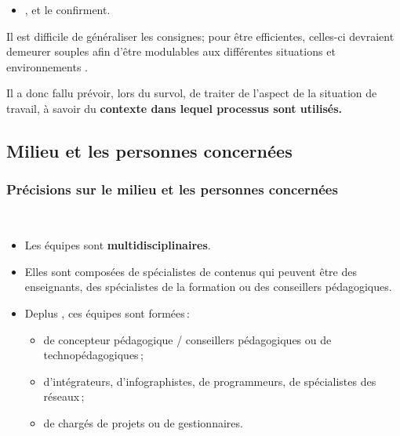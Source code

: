 \begin{frame}[allowframebreaks]
\begin{itemize}
                   \item \citet[p.10]{retalis1997a}, \citet[p.46]{smith2006a} et \citet[p.3]{pohl2004a} le confirment.
                   \end{itemize}
			\par Il est difficile de généraliser les consignes; pour être efficientes, celles-ci devraient demeurer souples afin d'être modulables aux différentes situations et environnements \citep[p.3]{pohl2004a}.
			\framebreak
			\par  Il a donc fallu prévoir, lors du survol, de traiter de l’aspect de la situation de travail, à savoir du \textbf{contexte dans lequel processus sont utilisés.}
                \end{frame}

\subsection{Milieu et les personnes concernées} 
		\begin{frame}[allowframebreaks]
			\frametitle{Précisions sur le milieu et les personnes concernées}
                        \
                        \begin{itemize} 
                        \item  Les équipes sont \textbf{multidisciplinaires}.
                        \item Elles sont composées de spécialistes de contenus qui peuvent être des enseignants, des spécialistes de la formation ou des conseillers pédagogiques.
                        \item Deplus , ces équipes sont formées\,: 
                        	\begin{itemize}
                        		\item de concepteur pédagogique / conseillers pédagogiques ou de technopédagogiques\,;
                        		\item d'intégrateurs, d'infographistes, de programmeurs, de spécialistes des réseaux\,;
                        		\item de chargés de projets ou de gestionnaires.
                        	\end{itemize}

                        \end{itemize}

             
                \end{frame}

